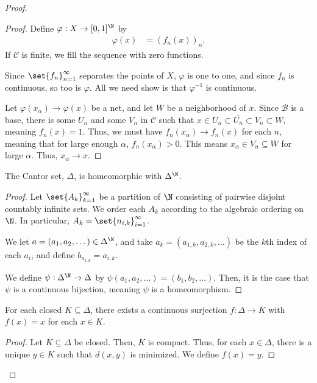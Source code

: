 \documentclass[10pt]{mypackage}
\begin{document}
\begin{proof}
\begin{proof}
    Define $\varphi: X\rightarrow [0,1]^{\N}$ by
    \begin{align*}
      \varphi(x) &= \left(f_n(x)\right)_{n}.
    \end{align*}
    If $\mathcal{C}$ is finite, we fill the sequence with zero functions.\newline

    Since $\set{f_n}_{n=1}^{\infty}$ separates the points of $X$, $\varphi$ is one to one, and since $f_n$ is continuous, so too is $\varphi$. All we need show is that $\varphi^{-1}$ is continuous.\newline

    Let $\varphi\left(x_{\alpha}\right) \rightarrow \varphi(x)$ be a net, and let $W$ be a neighborhood of $x$. Since $\mathcal{B}$ is a base, there is some $U_n$ and some $V_n$ in $\mathcal{C}$ such that $x\in U_n\subset \overline{U_n}\subset V_n\subset W$, meaning $f_n(x) = 1$. Thus, we must have $f_n\left(x_{\alpha}\right)\rightarrow f_n(x)$ for each $n$, meaning that for large enough $\alpha$, $f_n\left(x_{\alpha}\right) > 0$. This means $x_{\alpha}\in V_n\subseteq W$ for large $\alpha$. Thus, $x_{\alpha}\rightarrow x$.
  \end{proof}
  \begin{lemma}
    The Cantor set, $\Delta$, is homeomorphic with $\Delta^{\N}$.
  \end{lemma}
  \begin{proof}
    Let $\set{A_k}_{k=1}^{\infty}$ be a partition of $\N$ consisting of pairwise disjoint countably infinite sets. We order each $A_k$ according to the algebraic ordering on $\N$. In particular, $A_k = \set{n_{i,k}}_{i=1}^{\infty}$.\newline

    We let $a = \left(a_1,a_2,\dots\right)\in \Delta^{\N}$, and take $a_k = \left(a_{1,k},a_{2,k},\dots\right)$ be the $k$th index of each $a_i$, and define $b_{n_{i,k}} = a_{i,k}$.\newline

    We define $\psi: \Delta^{\N}\rightarrow \Delta$ by $\psi\left(a_1,a_2,\dots\right) = \left(b_1,b_2,\dots\right)$. Then, it is the case that $\psi$ is a continuous bijection, meaning $\psi$ is a homeomorphism.
  \end{proof}
  \begin{lemma}
    For each closed $K\subseteq \Delta$, there exists a continuous surjection $f: \Delta\rightarrow K$ with $f(x) = x$ for each $x\in K$.
  \end{lemma}
  \begin{proof}
    Let $K\subseteq \Delta$ be closed. Then, $K$ is compact. Thus, for each $x\in \Delta$, there is a unique $y\in K$ such that $d(x,y)$ is minimized. We define $f(x) = y$.\newline


\end{proof}
\end{proof}
\end{document}
